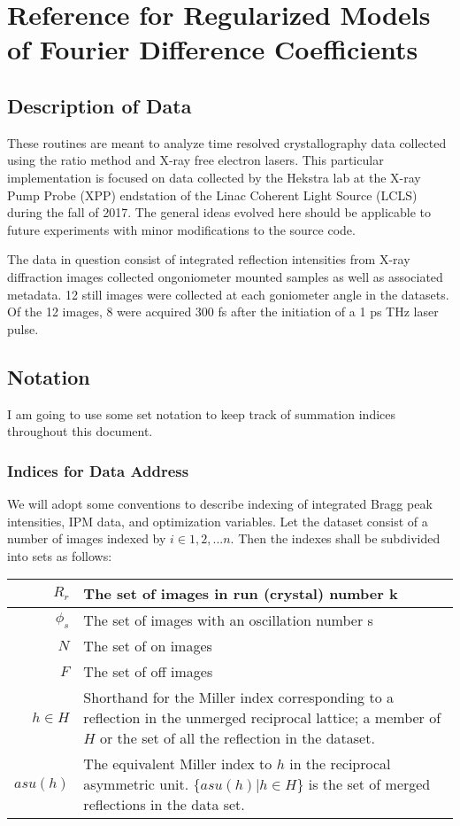 \documentclass{report}
\begin{document}
\chapter{Reference for Regularized Models of Fourier Difference Coefficients}
\section{Description of Data}
These routines are meant to analyze time resolved crystallography data collected using the ratio method and X-ray free electron lasers. This particular implementation is focused on data collected by the Hekstra lab at the X-ray Pump Probe (XPP) endstation of the Linac Coherent Light Source (LCLS) during the fall of 2017. The general ideas evolved here should be applicable to future experiments with minor modifications to the source code. 

The data in question consist of integrated reflection intensities from X-ray diffraction images collected ongoniometer mounted samples as well as associated metadata. 12 still images were collected at each goniometer angle in the datasets. Of the 12 images, 8 were acquired 300 fs after the initiation of a 1 ps THz laser pulse. 

\section{Notation}
I am going to use some set notation to keep track of summation indices throughout this document. 


\subsection{Indices for Data Address}
We will adopt some conventions to describe indexing of integrated Bragg peak intensities, IPM data, and optimization variables.
Let the dataset consist of a number of images indexed by $i\in {1, 2, ... n}$.
Then the indexes shall be subdivided into sets as follows:
\break


\begin{center}
\begin{tabular}{r | p{}}
$R_r$ & The set of images in run (crystal) number k \\ \hline
$\phi_s$ & The set of images with an oscillation number s \\ \hline
$N$ & The set of on images \\ \hline
$F$ & The set of off images \\ \hline
$h\in H$ & Shorthand for the Miller index corresponding to a reflection in the unmerged reciprocal lattice; a member of $H$ or the set of all the reflection in the dataset. \\ \hline
$asu(h)$ & The equivalent Miller index to $h$ in the reciprocal asymmetric unit. $\{asu(h) | h\in H \}$ is the set of merged reflections in the data set.
\end{tabular} 
\end{center}
\end{document}
